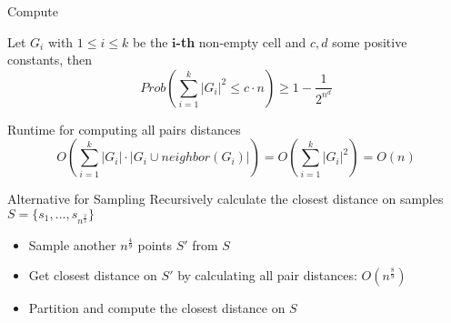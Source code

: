 \documentclass[18pt]{beamer}
\def \loose {15pt}
\begin{document}
\begin{frame}{Compute}

	\begin{theorem}
		Let $G_i$ with $1\leq i \leq k$ be the \textbf{$\boldsymbol{i}$-th} non-empty cell and $c, d$ some positive constants, then 
	$$Prob\left(\sum_{i=1}^k |G_i|^2 \leq c \cdot n \right) \geq  1 - \frac{1}{2^{n^d}}$$
	\end{theorem}

	Runtime for computing all pairs distances
$$O(\sum_{i=1}^k |G_i| \cdot |G_i \cup neighbor(G_i)| ) = O(\sum_{i=1}^k |G_i|^2) = O(n)$$

\end{frame}

\begin{frame}{Alternative for Sampling}
Recursively calculate the closest distance on samples $S = \{s_1,...,s_{n^{\frac{2}{3}}}\}$
\begin{itemize}
\setlength{\itemsep}{\loose}
\item Sample another $n^{\frac{4}{9}}$ points $S'$ from $S$
\item Get closest distance on $S'$ by calculating all pair distances: $O(n^{\frac{8}{9}})$
\item Partition and compute the closest distance on $S$
\end{itemize}
\end{frame}
\end{document}
